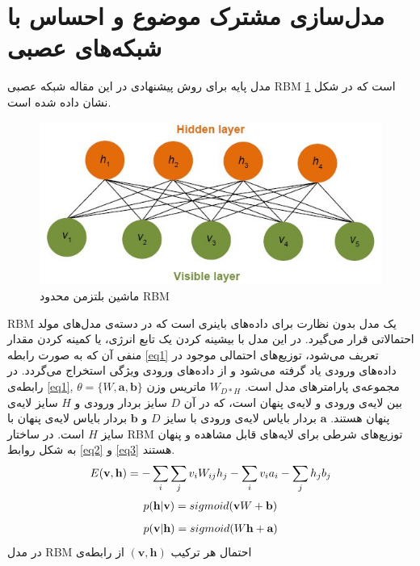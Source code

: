 \documentclass[12pt,a4paper]{article}
\begin{document}
\section{مدل‌سازی مشترک موضوع و احساس با شبکه‌های عصبی}
\label{sec3}

مدل پایه برای روش پیشنهادی در این مقاله  شبکه عصبی RBM است که در شکل
\ref{fig1}
نشان داده شده است.
\begin{figure}[!t]
	\centering
	\includegraphics[scale=0.5]{images/RBM}
	\caption{ماشین بلتزمن محدود RBM}
	\label{fig1}
\end{figure}
RBM 
یک مدل بدون نظارت برای داده‌های باینری است که در دسته‌ی مدل‌های مولد احتمالاتی  قرار می‌گیرد. در این مدل با بیشینه کردن یک تابع انرژی، یا کمینه کردن مقدار منفی‌ آن که به صورت رابطه
\ref{eq1}
تعریف می‌‌شود، توزیع‌های احتمالی‌ موجود در داده‌های ورودی یاد گرفته می‌شود و از داده‌های ورودی ویژگی‌ استخراج می‌‌گردد. در رابطه‌ی
\ref{eq1}, $\theta = \{W, \textbf{a}, \textbf{b}\}$
مجموعه‌ی پارامترهای مدل است.
$W_{D*H}$
ماتریس وزن بین لایه‌ی ورودی و لایه‌ی پنهان است، که در آن
$D$
سایز بردار ورودی و
$H$
سایز لایه‌ی پنهان هستند.
$\textbf{a}$
بردار بایاس لایه‌ی ورودی با سایز
$D$
و
$\textbf{b}$
بردار بایاس لایه‌ی پنهان با سایز
$H$
است. در ساختار RBM توزیع‌های شرطی برای لایه‌های قابل مشاهده و پنهان به شکل روابط
\ref{eq2}
و
\ref{eq3}
هستند.
\begin{align}
\centering
\label{eq1}
E(\textbf{v},\textbf{h}) = -\sum_{i} \sum_{j} v_iW_{ij}h_j - \sum_i v_ia_i - \sum_j h_jb_j
\end{align}
\begin{align}
\centering
\label{eq2}
p(\textbf{h}|\textbf{v})=sigmoid(\textbf{v}W + \textbf{b})
\end{align}
\begin{align}
\centering
\label{eq3}
p(\textbf{v}|\textbf{h})=sigmoid(W\textbf{h} + \textbf{a})
\end{align}
در مدل RBM احتمال هر ترکیب
$(\textbf{v},\textbf{h})$
از رابطه‌ی
\end{document}

